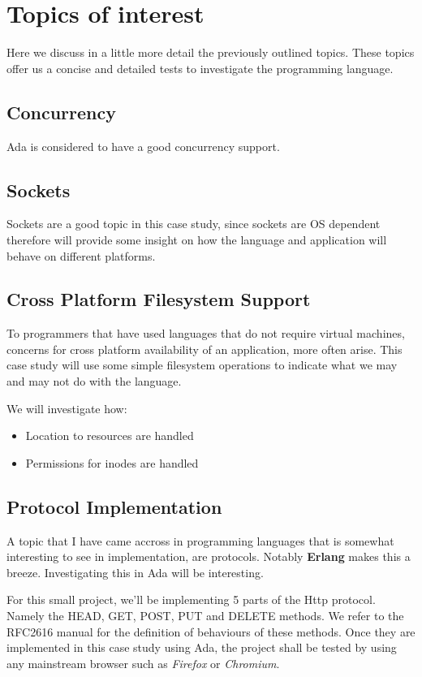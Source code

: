 \section{Topics of interest}
Here we discuss in a little more detail the previously outlined topics. These
topics offer us a concise and detailed tests to investigate the programming 
language.

\subsection{Concurrency}
Ada is considered to have a good concurrency support. 

\subsection{Sockets}
Sockets are a good topic in this case study, since sockets are OS dependent
therefore will provide some insight on how the language and application will
behave on different platforms. 

\subsection{Cross Platform Filesystem Support}
To programmers that have used languages that do not require virtual machines, 
concerns for cross platform availability of an application, more often arise. 
This case study will use some simple filesystem operations to indicate what we 
may and may not do with the language.

We will investigate how:
\begin{itemize}
  \item Location to resources are handled
  \item Permissions for inodes are handled
\end{itemize}

\subsection{Protocol Implementation}
A topic that I have came accross in programming languages that is somewhat
interesting to see in implementation, are protocols. Notably \textbf{Erlang} 
makes this a breeze. Investigating this in Ada will be interesting. 

For this small project, we'll be implementing 5 parts of the Http protocol. 
Namely the HEAD, GET, POST, PUT and DELETE methods. We refer to the RFC2616 manual \cite{RFC2616}
for the definition of behaviours of these methods. Once they are implemented in
this case study using Ada, the project shall be tested by using any mainstream 
browser such as \textit{Firefox} or \textit{Chromium}.

